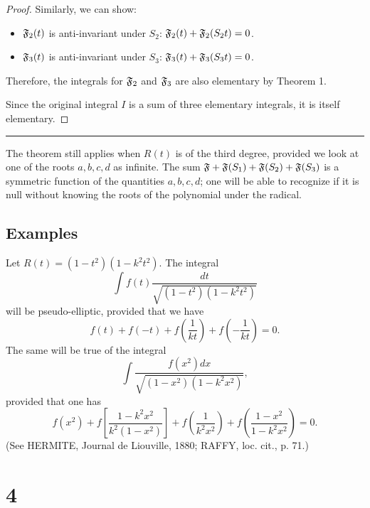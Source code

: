 \documentclass[11pt]{article}
\begin{document}
{\begin{proof}
Similarly, we can show:
\begin{itemize}
    \item $\mathfrak{F}_2(t)$ is anti-invariant under $S_2$: $\mathfrak{F}_2(t) + \mathfrak{F}_2(S_2 t) = 0$.
    \item $\mathfrak{F}_3(t)$ is anti-invariant under $S_3$: $\mathfrak{F}_3(t) + \mathfrak{F}_3(S_3 t) = 0$.
\end{itemize}
Therefore, the integrals for $\mathfrak{F}_2$ and $\mathfrak{F}_3$ are also elementary by Theorem 1.

Since the original integral $I$ is a sum of three elementary integrals, it is itself elementary.
\end{proof}
}

\medskip
      
\hrule

\bigskip

The theorem still applies when $R(t)$ is of the third degree, provided we look at one of the roots $a, b, c, d$ as infinite. The sum $\mathfrak{F}+\mathfrak{F}(S_{1})+\mathfrak{F}(S_{2})+\mathfrak{F}(S_{3})$ is a symmetric function of the quantities $a, b, c, d$; one will be able to recognize if it is null without knowing the roots of the polynomial under the radical.

\subsection*{Examples}
Let $R(t)=(1-t^{2})(1-k^{2}t^{2})$. The integral
\begin{equation*}
\int f(t)\frac{dt}{\sqrt{(1-t^{2})(1-k^{2}t^{2})}}
\end{equation*}
will be pseudo-elliptic, provided that we have
\begin{equation*}
f(t)+f(-t)+f\left(\frac{1}{kt}\right)+f\left(-\frac{1}{kt}\right)=0.
\end{equation*}
The same will be true of the integral
\begin{equation*}
\int\frac{f(x^{2})dx}{\sqrt{(1-x^{2})(1-k^{2}x^{2})}},
\end{equation*}
provided that one has
\begin{equation*}
f(x^{2})+f\left[\frac{1-k^{2}x^{2}}{k^{2}(1-x^{2})}\right]+f\left(\frac{1}{k^{2}x^{2}}\right)+f\left(\frac{1-x^{2}}{1-k^{2}x^{2}}\right)=0.
\end{equation*}
(See HERMITE, Journal de Liouville, 1880; RAFFY, loc. cit., p. 71.)

\section*{4}
\end{document}
